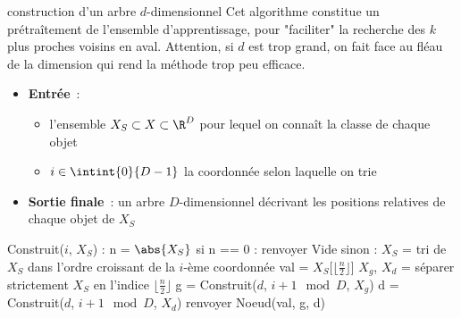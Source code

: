 \begin{adjustwidth}{-3cm}{-3cm}
\begin{implementation}{construction d'un arbre $d$-dimensionnel}
    Cet algorithme constitue un prétraîtement de l'ensemble d'apprentissage, pour "faciliter" la recherche des $k$ plus proches voisins en aval. Attention, si $d$ est trop grand, on fait face au fléau de la dimension qui rend la méthode trop peu efficace.
    \begin{itemize}
        \item \textbf{Entrée}~: \begin{itemize}
            \item l'ensemble $X_S \subset X \subset \R^D$ pour lequel on connaît la classe de chaque objet
            \item $i \in \intint{0}{D-1}$ la coordonnée selon laquelle on trie
        \end{itemize}
        \item \textbf{Sortie finale}~: un arbre $D$-dimensionnel décrivant les positions relatives de chaque objet de $X_S$
    \end{itemize}
    \begin{lstLNat}
    Construit($i$, $X_S$) :
        n = $\abs{X_S}$
        si n == 0 :
            renvoyer Vide
        sinon :
            $X_S$ = tri de $X_S$ dans l'ordre croissant de 
                    la $i$-ème coordonnée
            val = $X_S$[$\lfloor \frac{n}{2} \rfloor$]
            $X_g$, $X_d$ = séparer strictement $X_S$ en l'indice $\lfloor \frac{n}{2} \rfloor$
            g = Construit($d$, $i+1 \mod D$, $X_g$)
            d = Construit($d$, $i+1 \mod D$, $X_d$)
            renvoyer Noeud(val, g, d)
    \end{lstLNat}
\end{implementation}


\end{adjustwidth}
